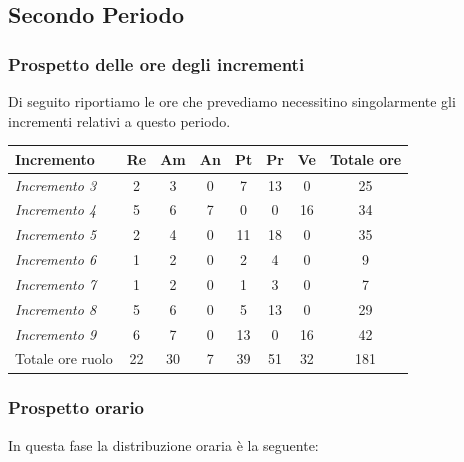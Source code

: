 {{{{{{{{{\subsection{Secondo Periodo}\label{PreventivoFaseDiProgettazioneDiDettaglioECodificaPeriodo2}

\subsubsection{Prospetto delle ore degli incrementi}\label{PreventivoFaseDiProgettazioneDiDettaglioECodificaPeriodo2Incrementi}
Di seguito riportiamo le ore che prevediamo necessitino singolarmente gli incrementi relativi a questo periodo.
\quad
\def\tabularxcolumn#1{m{#1}}
{
	
	\begin{center}
		\renewcommand{\arraystretch}{1.4}
		\begin{tabularx}{\textwidth}{|X|c|c|c|c|c|c|c|}
			\hline
			\rowcolor{airforceblue}
			\textbf{Incremento} & \textbf{Re} & \textbf{Am} & \textbf{An} & \textbf{Pt} & \textbf{Pr} & \textbf{Ve} & \textbf{Totale ore}\\
			\hline
			\textit{Incremento 3} & 2 & 3 & 0 & 7 & 13 & 0 & 25\\
			\hline
			\textit{Incremento 4} & 5 & 6 & 7 & 0 & 0 & 16 & 34\\
			\hline
			\textit{Incremento 5} & 2 & 4 & 0 & 11 & 18 & 0 & 35\\
			\hline
			\textit{Incremento 6} & 1 & 2 & 0 & 2 & 4 & 0 & 9\\
			\hline
			\textit{Incremento 7} & 1 & 2 & 0 & 1 & 3 & 0 & 7\\
			\hline
			\textit{Incremento 8} & 5 & 6 & 0 & 5 & 13 & 0 & 29\\
			\hline
			\textit{Incremento 9} & 6 & 7 & 0 & 13 & 0 & 16 & 42\\
			\hline
			Totale ore ruolo & 22 & 30 & 7 & 39 & 51 & 32 & 181\\
			\hline
		\end{tabularx}
	\end{center}
	
	\subsubsection{Prospetto orario}\label{PreventivoFaseDiProgettazioneDiDettaglioECodificaProspettoOrarioPeriodo2}
	In questa fase la distribuzione oraria è la seguente:
	\quad
	\def\tabularxcolumn#1{m{#1}}
	{
		
}}}}}}}}}}}
